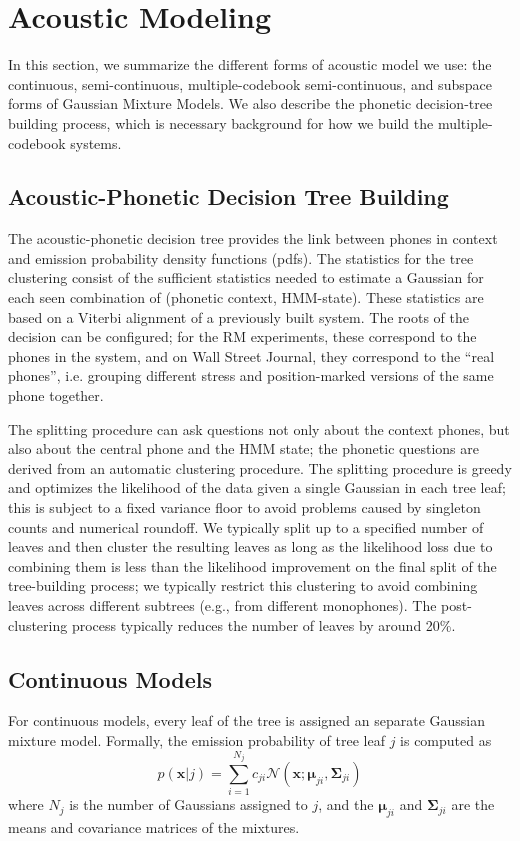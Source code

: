 \documentclass{article}
\def \x{{\mathbf x}}
\def \m{{\bm \mu}}
\def \k{{\mathbf \Sigma}}
\def \nv{{\mathcal N}}
\begin{document}
\section{Acoustic Modeling}
\label{sec:am}
In this section, we summarize the different forms of acoustic model we use: 
the continuous, semi-continuous, multiple-codebook semi-continuous, and 
subspace forms of Gaussian Mixture Models. 
We also describe the phonetic decision-tree building process, which is 
necessary background for how we build the multiple-codebook systems.

\subsection{Acoustic-Phonetic Decision Tree Building}
The acoustic-phonetic decision tree provides the link between phones
in context and emission probability density functions (pdfs). 
%
The statistics for the tree clustering consist of the 
sufficient statistics needed to estimate a Gaussian for each seen combination 
of (phonetic context, HMM-state).  These statistics are based on a Viterbi 
alignment of a previously built system.  The roots
of the decision can be configured; for the RM experiments, these correspond to
the phones in the system, and on Wall Street Journal, they
correspond to the ``real phones'', i.e. grouping different stress and
position-marked versions of the same phone together.  

The splitting procedure can ask questions not only about the context phones,
but also about the central phone and the HMM state; the phonetic questions are 
derived from an automatic clustering procedure.  The splitting procedure is
greedy and optimizes the likelihood of the data given a single Gaussian in each
tree leaf; this is subject to a fixed variance floor to avoid problems caused
by singleton counts and numerical roundoff.  We typically split up to a 
specified number of leaves and then cluster the resulting leaves as long as the
likelihood loss due to combining them is less than the likelihood improvement
on the final split of the tree-building process; we typically restrict this 
clustering to avoid combining leaves across different subtrees (e.g., from 
different monophones).  The post-clustering process typically reduces the number 
of leaves by around 20\%.

\subsection{Continuous Models}
For continuous models, every leaf of the tree is assigned an separate
Gaussian mixture model. Formally, the emission probability of tree leaf $j$ is 
computed as
\begin{equation}
p(\x | j) = \sum_{i=1}^{N_j} c_{ji} \nv(\x; \m_{ji}, \k_{ji}) 
\end{equation}
where $N_j$ is the number of Gaussians assigned to $j$, and the $\m_{ji}$ and
$\k_{ji}$ are the means and covariance matrices of the mixtures.
\end{document}
